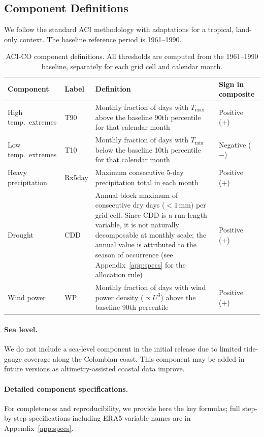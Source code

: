 \documentclass[12pt]{article}
\begin{document}
\subsection{Component Definitions}\label{sec:components}
 
We follow the standard ACI methodology \citep{aci2016} with adaptations for a tropical, land-only context. The baseline reference period is 1961--1990.
\begin{table}[H]
\centering\small
\renewcommand{\arraystretch}{1.3}
\begin{tabular}{@{}p{2.2cm}p{1.5cm}p{6.5cm}p{2.5cm}@{}}
\toprule
\textbf{Component} & \textbf{Label} & \textbf{Definition} & \textbf{Sign in composite}\\
\midrule
High temp.\ extremes & T90 & Monthly fraction of days with $T_{\max}$ above the baseline 90th percentile for that calendar month & Positive (+)\\
Low temp.\ extremes & T10 & Monthly fraction of days with $T_{\min}$ below the baseline 10th percentile for that calendar month & Negative ($-$)\\
Heavy precipitation & Rx5day & Maximum consecutive 5-day precipitation total in each month & Positive (+)\\
Drought & CDD & Annual block maximum of consecutive dry days ($<1$\,mm) per grid cell. Since CDD is a run-length variable, it is not naturally decomposable at monthly scale; the annual value is attributed to the season of occurrence (see Appendix~\ref{app:specs} for the allocation rule) & Positive (+)\\
Wind power & WP & Monthly fraction of days with wind power density ($\propto U^3$) above the baseline 90th percentile & Positive (+)\\
\bottomrule
\end{tabular}
\caption{ACI-CO component definitions. All thresholds are computed from the 1961--1990 baseline, separately for each grid cell and calendar month.}
\label{tab:components}
\end{table}

\paragraph{Sea level.} We do not include a sea-level component in the initial release due to limited tide-gauge coverage along the Colombian coast. This component may be added in future versions as altimetry-assisted coastal data improve.

\paragraph{Detailed component specifications.} For completeness and reproducibility, we provide here the key formulas; full step-by-step specifications including ERA5 variable names are in Appendix~\ref{app:specs}.
\end{document}
